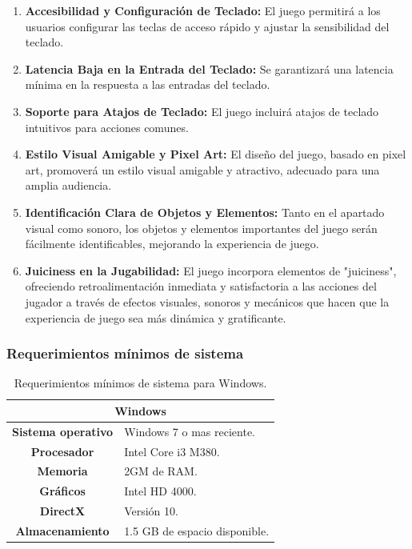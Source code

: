 \documentclass[12pt,twoside]{article}
\begin{document}
\begin{enumerate}[label=RNF\arabic*]
		\item \textbf{Accesibilidad y Configuración de Teclado: }El juego permitirá a los usuarios configurar las teclas de acceso rápido y ajustar la sensibilidad del teclado.
		\item \textbf{Latencia Baja en la Entrada del Teclado: }Se garantizará una latencia mínima en la respuesta a las entradas del teclado.
		\item \textbf{Soporte para Atajos de Teclado: }El juego incluirá atajos de teclado intuitivos para acciones comunes.
		\item \textbf{Estilo Visual Amigable y Pixel Art: }El diseño del juego, basado en pixel art, promoverá un estilo visual amigable y atractivo, adecuado para una amplia audiencia.
		\item \textbf{Identificación Clara de Objetos y Elementos: }Tanto en el apartado visual como sonoro, los objetos y elementos importantes del juego serán fácilmente identificables, mejorando la experiencia de juego.
		\item \textbf{Juiciness en la Jugabilidad: }El juego incorpora elementos de "juiciness", ofreciendo retroalimentación inmediata y satisfactoria a las acciones del jugador a través de efectos visuales, sonoros y mecánicos que hacen que la experiencia de juego sea más dinámica y gratificante.
		
	\end{enumerate}
	
	
	\subsubsection{Requerimientos mínimos de sistema}

	\begin{table}[H]
		\centering
		\begin{tabular}{|c|l|}
			\hline
			\multicolumn{2}{|c|}{\textbf{Windows}} \\ \hline
			\textbf{Sistema operativo} & Windows  7 o mas reciente.\\ \hline
			\textbf{Procesador} &  Intel Core i3 M380. \\ \hline
			\textbf{Memoria} &  2GM de RAM. \\ \hline
			\textbf{Gráficos} &   Intel HD 4000. \\ \hline
			\textbf{DirectX} &   Versión 10. \\ \hline
			\textbf{Almacenamiento} &   1.5 GB de espacio disponible. \\ \hline
		\end{tabular}
		\caption{Requerimientos mínimos de sistema para Windows.}
		\label{table: requerimientos_windows}
	\end{table} 
	
\end{document}
